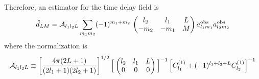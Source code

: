 \documentclass[prd,amsmath,amssymb,floatfix,superscriptaddress,nofootinbib,preprintnumbers]{revtex4-1}
\def\be{\begin{equation}}
\def\ee{\end{equation}}
\begin{document}
Therefore, an estimator for the time delay field is
\be
\hat d_{LM} = \mathcal{A}_{l_1l_2L} \sum_{m_1m_2}  (-1)^{m_1+m_2}\,\left(\begin{matrix} l_2 & l_1 &L\cr -m_2&-m_1&M\end{matrix}\right)
 a^{\rm obs}_{l_1m_1} a^{\rm obs}_{l_2m_2} 
 \ee
 where the normalization is
 \be
 \mathcal{A}_{l_1l_2L} \equiv 
 \left[ \frac{4\pi (2L+1)}{(2l_1+1)(2l_2+1)}\right]^{1/2}
 \Big[
 \left(\begin{matrix} l_2& l_1 &L\cr 0&0&0\end{matrix}\right)
  \Big]^{-1}
  \left[ C^{(1)}_{l_1} + (-1)^{l_1+l_2+L}C^{(1)}_{l_2}\right]^{-1}
 \ee
 

\end{document}
